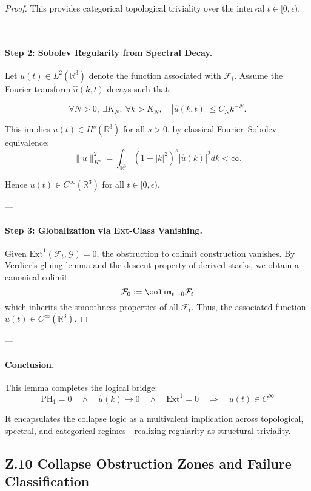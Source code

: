 \documentclass[11pt]{article}
\begin{document}
\begin{axiom}
\begin{axiom}
{{\begin{proof}
This provides categorical topological triviality over the interval \( t \in [0, \epsilon) \).

---

\paragraph{Step 2: Sobolev Regularity from Spectral Decay.}
Let \( u(t) \in L^2(\mathbb{R}^3) \) denote the function associated with \( \mathcal{F}_t \).  
Assume the Fourier transform \( \widehat{u}(k, t) \) decays such that:

\[
\forall N > 0,\ \exists K_N,\ \forall k > K_N,\quad
|\widehat{u}(k, t)| \leq C_N k^{-N}.
\]

This implies \( u(t) \in H^s(\mathbb{R}^3) \) for all \( s > 0 \),  
by classical Fourier–Sobolev equivalence:
\[
\| u \|_{H^s}^2 = \int_{\mathbb{R}^3} (1 + |k|^2)^s |\widehat{u}(k)|^2 dk < \infty.
\]

Hence \( u(t) \in C^\infty(\mathbb{R}^3) \) for all \( t \in [0, \epsilon) \).

---

\paragraph{Step 3: Globalization via Ext-Class Vanishing.}
Given \( \mathrm{Ext}^1(\mathcal{F}_t, \mathcal{G}) = 0 \),  
the obstruction to colimit construction vanishes.  
By Verdier’s gluing lemma and the descent property of derived stacks,  
we obtain a canonical colimit:
\[
\mathcal{F}_0 := \colim_{t \to 0} \mathcal{F}_t
\]
which inherits the smoothness properties of all \( \mathcal{F}_t \).  
Thus, the associated function \( u(t) \in C^\infty(\mathbb{R}^3) \).

\end{proof}

---

\paragraph{Conclusion.}
This lemma completes the logical bridge:
\[
\boxed{
\mathrm{PH}_1 = 0 \quad \wedge \quad \widehat{u}(k) \to 0 \quad \wedge \quad \mathrm{Ext}^1 = 0
\quad \Longrightarrow \quad u(t) \in C^\infty
}
\]

It encapsulates the collapse logic as a multivalent implication  
across topological, spectral, and categorical regimes—realizing regularity as structural triviality.


\subsection*{Z.10 Collapse Obstruction Zones and Failure Classification}

}}
\end{axiom}
\end{axiom}
\end{document}
